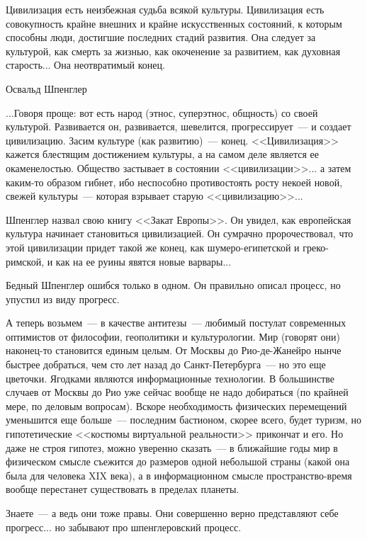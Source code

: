 \documentclass{scrbook}
\makeatletter
\newcommand{\bigepigraphwidth}{0.8} %
\newcommand{\defaultepigraphwidth}{0.5} %
\newcommand{\flqq}{<<}
\newcommand{\frqq}{>>}
\newcommand{\mdash}{~--- }
\newcommand{\myepigraph}[3][\@empty]{
	\ifx\@empty#1
		\setlength{\epigraphwidth}{\defaultepigraphwidth\textwidth}
	\else
		\setlength{\epigraphwidth}{#1\textwidth}
	\fi
	\epigraph{#2}{#3}
	\setlength{\epigraphwidth}{\defaultepigraphwidth\textwidth} %
	\nopagebreak
}
\makeatother
\begin{document}
\myepigraph[\bigepigraphwidth]{Цивилизация есть неизбежная судьба всякой культуры. Цивилизация есть совокупность крайне внешних и крайне искусственных состояний, к которым способны люди, достигшие последних стадий развития. Она следует за культурой, как смерть за жизнью, как окоченение за развитием, как духовная старость... Она неотвратимый конец.}
{Освальд Шпенглер}

...Говоря проще: вот есть народ (этнос, суперэтнос, общность) со своей культурой. Развивается он, развивается, шевелится, прогрессирует{\mdash}и создает цивилизацию. Засим культуре (как развитию){\mdash}конец. {\flqq}Цивилизация{\frqq} кажется блестящим достижением культуры, а на самом деле является ее окаменелостью. Общество застывает в состоянии {\flqq}цивилизации{\frqq}... а затем каким-то образом гибнет, ибо неспособно противостоять росту некоей новой, свежей культуры{\mdash}которая взрывает старую {\flqq}цивилизацию{\frqq}...

Шпенглер назвал свою книгу {\flqq}Закат Европы{\frqq}. Он увидел, как европейская культура начинает становиться цивилизацией. Он сумрачно пророчествовал, что этой цивилизации придет такой же конец, как шумеро-египетской и греко-римской, и как на ее руины явятся новые варвары...

Бедный Шпенглер ошибся только в одном. Он правильно описал процесс, но упустил из виду прогресс.

А теперь возьмем{\mdash}в качестве антитезы{\mdash}любимый постулат современных оптимистов от философии, геополитики и культурологии. Мир (говорят они) наконец-то становится единым целым. От Москвы до Рио-де-Жанейро нынче быстрее добраться, чем сто лет назад до Санкт-Петербурга{\mdash}но это еще цветочки. Ягодками являются информационные технологии. В большинстве случаев от Москвы до Рио уже сейчас вообще не надо добираться (по крайней мере, по деловым вопросам). Вскоре необходимость физических перемещений уменьшится еще больше{\mdash}последним бастионом, скорее всего, будет туризм, но гипотетические {\flqq}костюмы виртуальной реальности{\frqq} прикончат и его. Но даже не строя гипотез, можно уверенно сказать{\mdash}в ближайшие годы мир в физическом смысле съежится до размеров одной небольшой страны (какой она была для человека XIX века), а в информационном смысле пространство-время вообще перестанет существовать в пределах планеты.

Знаете{\mdash}а ведь они тоже правы. Они совершенно верно представляют себе прогресс... но забывают про шпенглеровский процесс.
\end{document}
